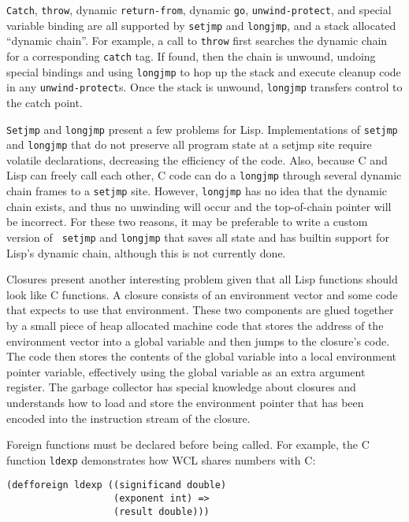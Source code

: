 {\tt Catch}, {\tt throw}, dynamic {\tt return-from}, dynamic {\tt go},
{\tt unwind-protect}, and special variable binding are all supported
by {\tt setjmp} and {\tt longjmp}, and a stack allocated ``dynamic
chain''. For example, a call to {\tt throw} first searches the dynamic
chain for a corresponding {\tt catch} tag. If found, then the chain is
unwound, undoing special bindings and using {\tt longjmp} to hop up
the stack and execute cleanup code in any {\tt unwind-protect}s. Once
the stack is unwound, {\tt longjmp} transfers control to the catch
point.

{\tt Setjmp} and {\tt longjmp} present a few problems for Lisp.
Implementations of {\tt setjmp} and {\tt longjmp} that do not preserve
all program state at a setjmp site require volatile declarations,
decreasing the efficiency of the code. Also, because C and Lisp can
freely call each other, C code can do a {\tt longjmp} through several
dynamic chain frames to a {\tt setjmp} site.  However, {\tt longjmp}
has no idea that the dynamic chain exists, and thus no unwinding will
occur and the top-of-chain pointer will be incorrect.  For these two
reasons, it may be preferable to write a custom version of {\tt
setjmp} and {\tt longjmp} that saves all state and has builtin support
for Lisp's dynamic chain, although this is not currently done.

Closures present another interesting problem given that all
Lisp functions should look like C functions.  A closure consists of an
environment vector and some code that expects to use that
environment. These two components are glued together by a small piece
of heap allocated machine code that stores the address of the
environment vector into a global variable and then jumps to the
closure's code.  The code then stores the contents of the global
variable into a local environment pointer variable, effectively using
the global variable as an extra argument register. The garbage
collector has special knowledge about closures and understands how to
load and store the environment pointer that has been encoded into the
instruction stream of the closure.

Foreign functions must be declared before being called. For example,
the C function {\tt ldexp} demonstrates how WCL shares numbers with C:

\begin{verbatim}
(defforeign ldexp ((significand double) 
                   (exponent int) => 
                   (result double)))
\end{verbatim}

